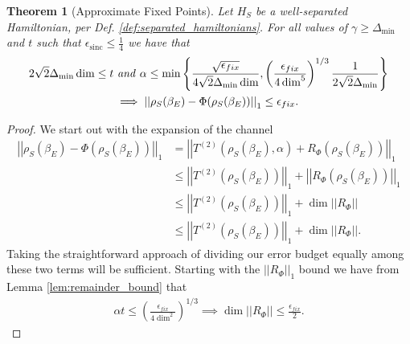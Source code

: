 \documentclass{article}
\newtheorem{theorem}{Theorem}
\newcommand{\parens}[1]{\left( #1 \right)}
\newcommand{\norm}[1]{\left| \left| #1 \right| \right|}
\newcommand{\set}[1]{\left\{ #1 \right\}}
\DeclareMathOperator{\sinc}{sinc}
\begin{document}
\begin{theorem}[Approximate Fixed Points]
    Let $H_S$ be a well-separated Hamiltonian, per Def. \ref{def:separated_hamiltonians}. For all values of $\gamma \geq \Delta_{\min}$ and $t$ such that $\epsilon_{\sinc} \leq \frac{1}{4}$ we have that 
    \begin{align}
        2 \sqrt{2} \Delta_{\min} \dim \leq t& \text{ \emph{and} } \alpha \leq \min \set{\frac{\sqrt{\epsilon_{fix}}}{4 \sqrt{2} \Delta_{\min} \dim}, \parens{\frac{\epsilon_{fix}}{4 \dim^5}}^{1/3} \frac{1}{2 \sqrt{2} \Delta_{\min} }} \nonumber \\
        &\implies \norm{\rho_S(\beta_E) - \Phi(\rho_S(\beta_E))}_1 \leq \epsilon_{fix}. \label{eq:beta_e_fixed_point_reqs}
    \end{align}
\end{theorem}
\begin{proof}
    We start out with the expansion of the channel
    \begin{align}
        \norm{\rho_S(\beta_E) - \Phi(\rho_S(\beta_E))}_1 &= \norm{T^{(2)}(\rho_S(\beta_E), \alpha) + R_{\Phi}(\rho_S(\beta_E))}_1 \\
        &\leq \norm{T^{(2)}(\rho_S(\beta_E))}_1 + \norm{R_{\Phi}(\rho_S(\beta_E))}_1 \\
        &\leq \norm{T^{(2)}(\rho_S(\beta_E))}_1 + \dim \norm{R_{\Phi}} \\
        &\leq \norm{T^{(2)}(\rho_S(\beta_E))}_1 + \dim \norm{R_{\Phi}}.
    \end{align}
    Taking the straightforward approach of dividing our error budget equally among these two terms will be sufficient. Starting with the $\norm{R_{\Phi}}_1$ bound we have from Lemma \ref{lem:remainder_bound} that
    \begin{align}
        \alpha t \leq \parens{\frac{\epsilon_{fix}}{4 \dim^2}}^{1/3} \implies \dim \norm{R_{\Phi}} \leq \frac{\epsilon_{fix}}{2}. \label{tmp:first_alpha_t_req_fixed_pt}
    \end{align}


\end{proof}
\end{document}
